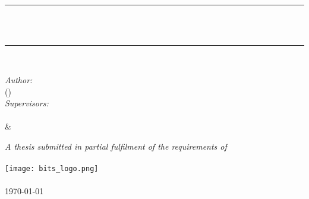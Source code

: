 \documentclass[11pt, a4paper, oneside]{Thesis} %
\title{\ttitle} %
\begin{document}
\frontmatter %


\fancyhead{} %
\rhead{\thepage} %
\lhead{} %

\pagestyle{fancy} %

\newcommand{\HRule}{\rule{\linewidth}{0.5mm}}



\begin{titlepage}
\begin{center}

\textsc{\LARGE \univname}\\[1.5cm] %
\textsc{\Large \doctype}\\[0.5cm] %

\HRule \\[0.4cm] %
{\huge \bfseries \ttitle}\\[0.4cm] %
\HRule \\[1.5cm] %

\begin{center}
\emph{Author:}\\
\authornames (\idnum)\\
\vspace{0.5cm}
\emph{Supervisors:} \\
\supname \\ %
\& \\
\cosupname %
\end{center}

\large \textit{A thesis submitted in partial fulfilment of the requirements
    of\\\ccode{} \cname}\\[2cm] %

\texttt{[image: bits\_logo.png]}\\ %
\UNIVNAME\\
{\large \today}\\[4cm] %
\vfill
\end{center}

\end{titlepage}
\end{document}
